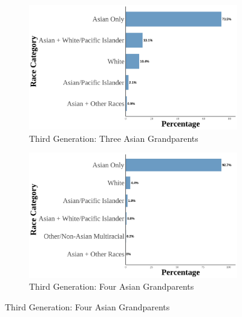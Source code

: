 \begin{landscape}
\begin{figure}[!htb]
\begin{subfigure}{.32\textwidth}
\end{subfigure}

\vspace{1cm}

\hspace*{\fill}
\begin{subfigure}{.4\textwidth}
\caption{Third Generation: Three Asian Grandparents}
\centering
\includegraphics[width=1\linewidth]{histogram_asian_american_race_thirdgen_threeasiangran.png}
\end{subfigure}
\hfill
\begin{subfigure}{.4\textwidth}
\caption{Third Generation: Four Asian Grandparents}
\centering
\includegraphics[width=1\linewidth]{histogram_asian_american_race_thirdgen_fourasiangran.png}
\end{subfigure}
\hspace*{\fill}


\end{figure}
\end{landscape}
